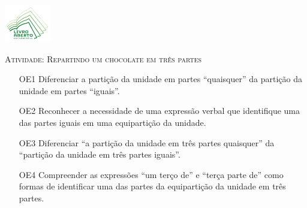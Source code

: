 \documentclass[10 pt,usenames,dvipsnames, oneside]{article}
\begin{document}
\begin{center}
  \begin{minipage}[l]{3cm}
\includegraphics[width=2cm]{logo}    
\end{minipage}\hfill
\begin{minipage}[r]{.8\textwidth}
 {\Large \scshape Atividade: Repartindo um chocolate em três partes}  
\end{minipage}
\end{center}
\vspace{.2cm}

\ifdefined\prof
\begin{goals}

\begin{enumerate}

\item[OE1] Diferenciar a partição da unidade em partes “quaisquer”
da partição da unidade em partes “iguais”.
\item[OE2] Reconhecer a necessidade de uma expressão verbal
que identifique uma das partes iguais em uma equipartição
da unidade.
\item[OE3] Diferenciar “a partição da unidade em três partes
quaisquer” da “partição da unidade em três partes
iguais”.
\item[OE4] Compreender as expressões “um terço de” e “terça
parte de” como formas de identificar uma das partes da
equipartição da unidade em três partes.

\end{enumerate}

\tcblower


\end{goals}
\end{document}
